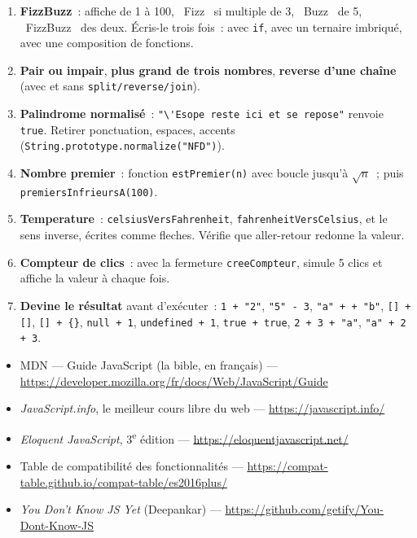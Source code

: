 \documentclass[12pt,a4paper,twoside,openright]{book}
\begin{document}
\begin{exercice}
\begin{enumerate}
  \item \textbf{FizzBuzz}~: affiche de 1 \`a 100, \og ~Fizz~ \fg{} si multiple de 3, \og ~Buzz~ \fg{} de 5,
        \og ~FizzBuzz~ \fg{} des deux. \'Ecris-le trois fois~: avec \verb|if|, avec un ternaire imbriqu\'e,
        avec une composition de fonctions.
  \item \textbf{Pair ou impair}, \textbf{plus grand de trois nombres}, \textbf{reverse d'une cha\^ine}
        (avec et sans \verb|split/reverse/join|).
  \item \textbf{Palindrome normalis\'e}~: \verb|"\'Esope reste ici et se repose"| renvoie \verb|true|.
        Retirer ponctuation, espaces, accents (\verb|String.prototype.normalize("NFD")|).
  \item \textbf{Nombre premier}~: fonction \verb|estPremier(n)| avec boucle jusqu'\`a
        $\sqrt{n}$~; puis \verb|premiersInfrieursA(100)|.
  \item \textbf{Temperature}~: \verb|celsiusVersFahrenheit|, \verb|fahrenheitVersCelsius|,
        et le sens inverse, \'ecrites comme fleches. V\'erifie que aller-retour redonne la valeur.
  \item \textbf{Compteur de clics}~: avec la fermeture \verb|creeCompteur|, simule 5 clics
        et affiche la valeur \`a chaque fois.
  \item \textbf{Devine le r\'esultat} avant d'ex\'ecuter~: \verb|1 + "2"|, \verb|"5" - 3|,
        \verb|"a" + + "b"|, \verb|[] + []|, \verb|[] + {}|, \verb|null + 1|,
        \verb|undefined + 1|, \verb|true + true|, \verb|2 + 3 + "a"|, \verb|"a" + 2 + 3|.
\end{enumerate}
\end{exercice}

\begin{ressources}
\begin{itemize}
  \item MDN --- Guide JavaScript (la bible, en fran\c{c}ais) --- \url{https://developer.mozilla.org/fr/docs/Web/JavaScript/Guide}
  \item \emph{JavaScript.info}, le meilleur cours libre du web --- \url{https://javascript.info/}
  \item \emph{Eloquent JavaScript}, 3\textsuperscript{e} \'edition --- \url{https://eloquentjavascript.net/}
  \item Table de compatibilit\'e des fonctionnalit\'es --- \url{https://compat-table.github.io/compat-table/es2016plus/}
  \item \emph{You Don't Know JS Yet} (Deepankar) --- \url{https://github.com/getify/You-Dont-Know-JS}
\end{itemize}
\end{ressources}
\end{document}
